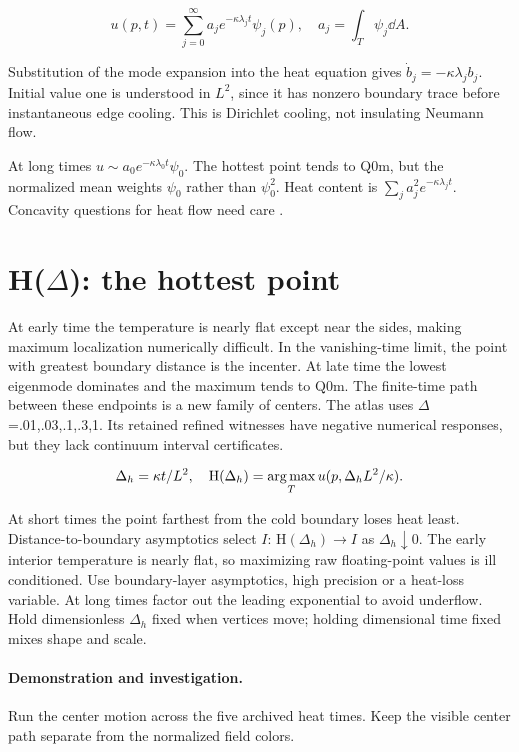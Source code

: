 \documentclass[11pt,oneside,openany]{book}
\newcommand{\argmax}{\operatorname*{arg\,max}}\newcommand{\argmin}{\operatorname*{arg\,min}}
\begin{document}
\[u(p,t)=\sum_{j=0}^\infty a_je^{-\kappa\lambda_jt}\psi_j(p),\quad a_j=\int_T\psi_j\dd A.\]



Substitution of the mode expansion into the heat equation gives
$\dot b_j=-\kappa\lambda_jb_j$. Initial value one is understood in
$L^2$, since it has nonzero boundary trace before instantaneous
edge cooling. This is Dirichlet cooling, not insulating Neumann flow.

At long times
$u\sim a_0e^{-\kappa\lambda_0t}\psi_0$.
The hottest point tends to Q0m, but the normalized mean weights
$\psi_0$ rather than $\psi_0^2$. Heat content is
$\sum_j a_j^2e^{-\kappa\lambda_jt}$.
Concavity questions for heat flow need care \cite{heatconc}.




\section{H(\ensuremath{\Delta}): the hottest point}\label{sec:slide64}

At early time the temperature is nearly flat except near the sides, making maximum localization numerically difficult. In the vanishing-time limit, the point with greatest boundary distance is the incenter. At late time the lowest eigenmode dominates and the maximum tends to $\mathrm{Q0m}$. The finite-time path between these endpoints is a new family of centers. The atlas uses \ensuremath{\Delta}=.01,.03,.1,.3,1. Its retained refined witnesses have negative numerical responses, but they lack continuum interval certificates.


\[\Delta_h=\kappa t/L^2,\quad {\rm H}(\Delta_h)=\argmax_Tu(p,\Delta_hL^2/\kappa).\]



At short times the point farthest from the cold boundary loses
heat least. Distance-to-boundary asymptotics select $I$:
$\mathrm H(\Delta_h)\to I$ as $\Delta_h\downarrow0$.
The early interior temperature is nearly flat, so maximizing raw
floating-point values is ill conditioned. Use boundary-layer
asymptotics, high precision or a heat-loss variable.
At long times factor out the leading exponential to avoid underflow.
Hold dimensionless $\Delta_h$ fixed when vertices move; holding
dimensional time fixed mixes shape and scale.




\paragraph{Demonstration and investigation.} Run the center motion across the five archived heat times. Keep the visible center path separate from the normalized field colors.
\end{document}
